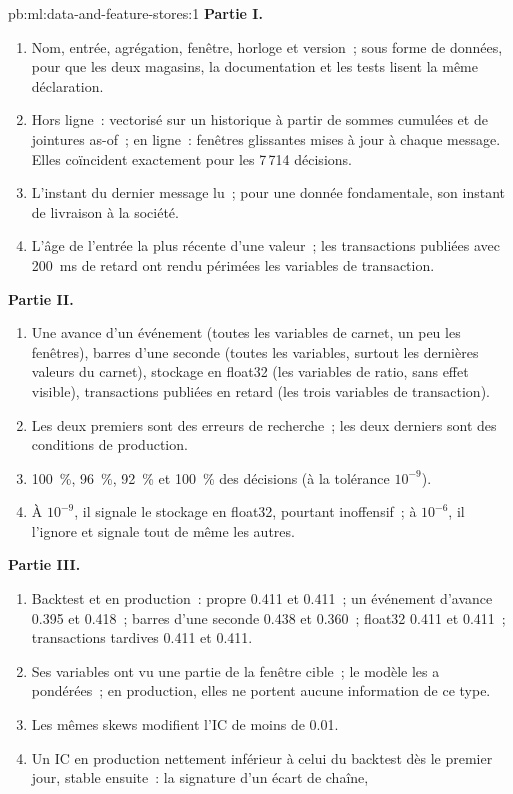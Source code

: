 \begin{solution}{pb:ml:data-and-feature-stores:1}
\textbf{Partie I.}
\begin{enumerate}
\item Nom, entrée, agrégation, fenêtre, horloge et version~; sous forme de données, pour que les deux magasins, la documentation et les tests lisent la
même déclaration.
\item Hors ligne~: vectorisé sur un historique à partir de sommes cumulées et de jointures as-of~; en ligne~: fenêtres glissantes mises à jour à chaque
message. Elles coïncident exactement pour les 7\,714 décisions.
\item L'instant du dernier message lu~; pour une donnée fondamentale, son instant de livraison à la société.
\item L'âge de l'entrée la plus récente d'une valeur~; les transactions publiées avec 200~ms de retard ont rendu périmées les variables de transaction.
\end{enumerate}
\textbf{Partie II.}
\begin{enumerate}[resume]
\item Une avance d'un événement (toutes les variables de carnet, un peu les fenêtres), barres d'une seconde (toutes les variables, surtout les dernières valeurs du
carnet), stockage en float32 (les variables de ratio, sans effet visible), transactions publiées en retard (les trois variables de transaction).
\item Les deux premiers sont des erreurs de recherche~; les deux derniers sont des conditions de production.
\item 100~\%, 96~\%, 92~\% et 100~\% des décisions (à la tolérance $10^{-9}$).
\item À $10^{-9}$, il signale le stockage en float32, pourtant inoffensif~; à $10^{-6}$, il l'ignore et signale tout de même les autres.
\end{enumerate}
\textbf{Partie III.}
\begin{enumerate}[resume]
\item Backtest et en production~: propre 0.411 et 0.411~; un événement d'avance 0.395 et 0.418~; barres d'une seconde 0.438 et 0.360~; float32 0.411
et 0.411~; transactions tardives 0.411 et 0.411.
\item Ses variables ont vu une partie de la fenêtre cible~; le modèle les a pondérées~; en production, elles ne portent aucune information de ce type.
\item Les mêmes skews modifient l'IC de moins de 0.01.
\item Un IC en production nettement inférieur à celui du backtest dès le premier jour, stable ensuite~: la signature d'un écart de chaîne,

\end{enumerate}
\end{solution}
